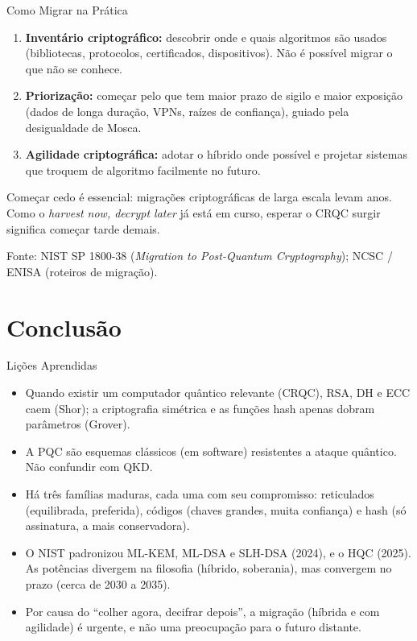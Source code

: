 \documentclass{beamer}
\begin{document}
\begin{frame}{Como Migrar na Prática}
    \begin{enumerate}
        \footnotesize
        \item \textbf{Inventário criptográfico:} descobrir onde e quais algoritmos são usados (bibliotecas, protocolos, certificados, dispositivos). Não é possível migrar o que não se conhece.
        \medskip
        \item \textbf{Priorização:} começar pelo que tem maior prazo de sigilo e maior exposição (dados de longa duração, VPNs, raízes de confiança), guiado pela desigualdade de Mosca.
        \medskip
        \item \textbf{Agilidade criptográfica:} adotar o híbrido onde possível e projetar sistemas que troquem de algoritmo facilmente no futuro.
    \end{enumerate}
    \medskip
    \begin{tcolorbox}[colback=red!5,colframe=red!60!black,boxrule=0.5pt]
        \footnotesize
        Começar cedo é essencial: migrações criptográficas de larga escala levam anos. Como o \textit{harvest now, decrypt later} já está em curso, esperar o CRQC surgir significa começar tarde demais.
    \end{tcolorbox}
    \smallskip
    {\tiny Fonte: NIST SP 1800-38 (\textit{Migration to Post-Quantum Cryptography}); NCSC / ENISA (roteiros de migração).}
\end{frame}

\section{Conclusão}

\begin{frame}{Lições Aprendidas}
    \begin{itemize}
        \item Quando existir um computador quântico relevante (CRQC), RSA, DH e ECC caem (Shor); a criptografia simétrica e as funções hash apenas dobram parâmetros (Grover).
        \medskip
        \item A PQC são esquemas clássicos (em software) resistentes a ataque quântico. Não confundir com QKD.
        \medskip
        \item Há três famílias maduras, cada uma com seu compromisso: reticulados (equilibrada, preferida), códigos (chaves grandes, muita confiança) e hash (só assinatura, a mais conservadora).
        \medskip
        \item O NIST padronizou ML-KEM, ML-DSA e SLH-DSA (2024), e o HQC (2025). As potências divergem na filosofia (híbrido, soberania), mas convergem no prazo (cerca de 2030 a 2035).
        \medskip
        \item Por causa do ``colher agora, decifrar depois'', a migração (híbrida e com agilidade) é urgente, e não uma preocupação para o futuro distante.
    \end{itemize}
\end{frame}
\end{document}

